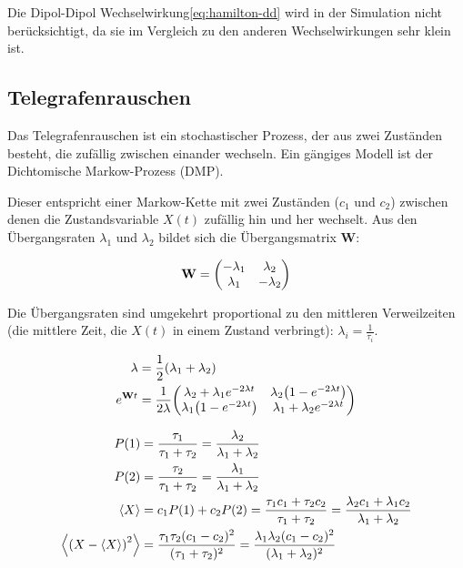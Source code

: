 \documentclass[main.tex]{subfiles}
\begin{document}
Die Dipol-Dipol Wechselwirkung\eqref{eq:hamilton-dd} wird in der Simulation nicht berücksichtigt, da sie im Vergleich zu den anderen Wechselwirkungen sehr klein ist.


\subsection{Telegrafenrauschen}

Das Telegrafenrauschen ist ein stochastischer Prozess, der aus zwei Zuständen besteht, die zufällig zwischen einander wechseln. Ein gängiges Modell ist der Dichtomische Markow-Prozess (DMP).

Dieser entspricht einer Markow-Kette mit zwei Zuständen (\(c_1\) und \(c_2\))
zwischen denen die Zustandsvariable \(X(t)\) zufällig hin und her wechselt. Aus
den Übergangsraten \(\lambda_1\) und \(\lambda_2\) bildet sich die
Übergangsmatrix \(\mathbf{W}\):

\begin{align}
	\mathbf{W} = \mqty(
	-\lambda_1 & \lambda_2   \\
	\lambda_1  & -\lambda_2)
\end{align}

Die Übergangsraten sind umgekehrt proportional zu den mittleren Verweilzeiten
(die mittlere Zeit, die \(X(t)\) in einem Zustand verbringt): \(\lambda_i =
\frac{1}{\tau_i}\).

\begin{align}
	\lambda &= \frac{1}{2} \qty(\lambda_1 + \lambda_2)\\
	e^{\mathbf{W}t} &= \frac{1}{2\lambda} \mqty(\lambda_2 + \lambda_1 e^{-2\lambda t} & \lambda_2 \qty(1- e^{-2\lambda t})\\
	\lambda_1 \qty(1- e^{-2\lambda t}) & \lambda_1 + \lambda_2 e^{-2\lambda t})
\end{align}

\begin{align}
	P(1)                            & = \frac{\tau_1}{\tau_1 + \tau_2} =
	\frac{\lambda_2 }{\lambda_1 +
		\lambda_2}
	\\
	P(2)                            & = \frac{\tau_2}{\tau_1 + \tau_2} =
	\frac{\lambda_1 }{\lambda_1 +
		\lambda_2}
	\\
	\expval{X}                      & = c_1 P(1) + c_2 P(2) = \frac{\tau_1
		c_1 + \tau_2
		c_2}{\tau_1 + \tau_2} = \frac{\lambda_2 c_1 + \lambda_1
		c_2}{\lambda_1 +
		\lambda_2}
	\\
	\expval{\qty(X - \expval{X})^2} & = \frac{\tau_1 \tau_2
		(c_1-c_2)^2}{(\tau_1 + \tau_2)^2} = \frac{\lambda_1 \lambda_2
		(c_1-c_2)^2}{(\lambda_1 + \lambda_2)^2}
\end{align}
\end{document}
